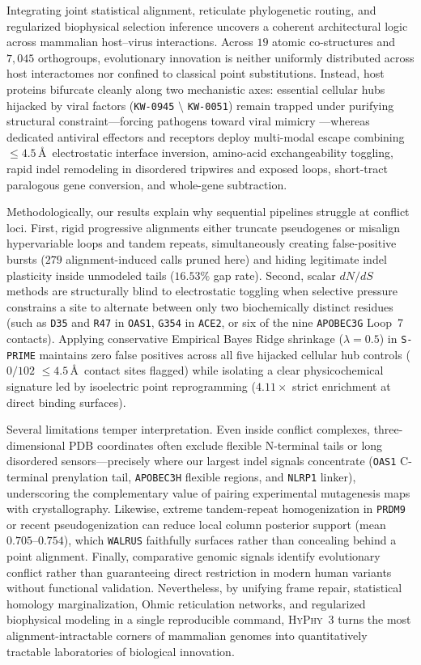 \documentclass[11pt,letterpaper]{article}
\newcommand{\HyPhyThree}{\textsc{HyPhy~3}\xspace}
\newcommand{\WALRUS}{\texttt{WALRUS}\xspace}
\newcommand{\SPRIME}{\texttt{S-PRIME}\xspace}
\begin{document}
Integrating joint statistical alignment, reticulate phylogenetic routing, and regularized biophysical selection inference uncovers a coherent architectural logic across mammalian host--virus interactions. Across $19$ atomic co-structures and $7,045$ orthogroups, evolutionary innovation is neither uniformly distributed across host interactomes nor confined to classical point substitutions. Instead, host proteins bifurcate cleanly along two mechanistic axes: essential cellular hubs hijacked by viral factors (\texttt{KW-0945} $\setminus$ \texttt{KW-0051}) remain trapped under purifying structural constraint---forcing pathogens toward viral mimicry \citep{enard2016viruses}---whereas dedicated antiviral effectors and receptors deploy multi-modal escape combining $\le 4.5$\,\AA\ electrostatic interface inversion, amino-acid exchangeability toggling, rapid indel remodeling in disordered tripwires and exposed loops, short-tract paralogous gene conversion, and whole-gene subtraction.

Methodologically, our results explain why sequential pipelines struggle at conflict loci. First, rigid progressive alignments either truncate pseudogenes or misalign hypervariable loops and tandem repeats, simultaneously creating false-positive bursts ($279$ alignment-induced calls pruned here) and hiding legitimate indel plasticity inside unmodeled tails ($16.53\%$ gap rate). Second, scalar $dN/dS$ methods are structurally blind to electrostatic toggling when selective pressure constrains a site to alternate between only two biochemically distinct residues (such as \texttt{D35} and \texttt{R47} in \texttt{OAS1}, \texttt{G354} in \texttt{ACE2}, or six of the nine \texttt{APOBEC3G} Loop~7 contacts). Applying conservative Empirical Bayes Ridge shrinkage ($\lambda = 0.5$) in \SPRIME maintains zero false positives across all five hijacked cellular hub controls ($0/102$ $\le 4.5$\,\AA\ contact sites flagged) while isolating a clear physicochemical signature led by isoelectric point reprogramming ($4.11\times$ strict enrichment at direct binding surfaces).

Several limitations temper interpretation. Even inside conflict complexes, three-dimensional PDB coordinates often exclude flexible N-terminal tails or long disordered sensors---precisely where our largest indel signals concentrate (\texttt{OAS1} C-terminal prenylation tail, \texttt{APOBEC3H} flexible regions, and \texttt{NLRP1} linker), underscoring the complementary value of pairing experimental mutagenesis maps with crystallography. Likewise, extreme tandem-repeat homogenization in \texttt{PRDM9} or recent pseudogenization can reduce local column posterior support (mean $0.705$--$0.754$), which \WALRUS faithfully surfaces rather than concealing behind a point alignment. Finally, comparative genomic signals identify evolutionary conflict rather than guaranteeing direct restriction in modern human variants without functional validation. Nevertheless, by unifying frame repair, statistical homology marginalization, Ohmic reticulation networks, and regularized biophysical modeling in a single reproducible command, \HyPhyThree turns the most alignment-intractable corners of mammalian genomes into quantitatively tractable laboratories of biological innovation.
\end{document}
